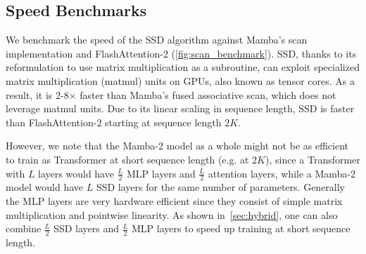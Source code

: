 \documentclass{article}
\begin{document}
\subsection{Speed Benchmarks}
\label{sec:experiments:benchmark}

We benchmark the speed of the SSD algorithm against Mamba's scan implementation and FlashAttention-2 (\cref{fig:scan_benchmark}).
SSD, thanks to its reformulation to use matrix multiplication as a subroutine, can exploit specialized matrix multiplication (matmul) units on GPUs, also known as tensor cores.
As a result, it is 2-8$\times$ faster than Mamba's fused associative scan, which does not leverage matmul units.
Due to its linear scaling in sequence length, SSD is faster than FlashAttention-2 starting at sequence length $2K$.

However, we note that the Mamba-2 model as a whole might not be as efficient to train as Transformer at short sequence length (e.g. at $2K$), since a Transformer with $L$ layers would have $\frac{L}{2}$ MLP layers and $\frac{L}{2}$ attention layers, while a Mamba-2 model would have $L$ SSD layers for the same number of parameters.
Generally the MLP layers are very hardware efficient since they consist of simple matrix multiplication and pointwise linearity.
As shown in~\cref{sec:hybrid}, one can also combine $\frac{L}{2}$ SSD layers and $\frac{L}{2}$ MLP layers to speed up training at short sequence length.
\end{document}
